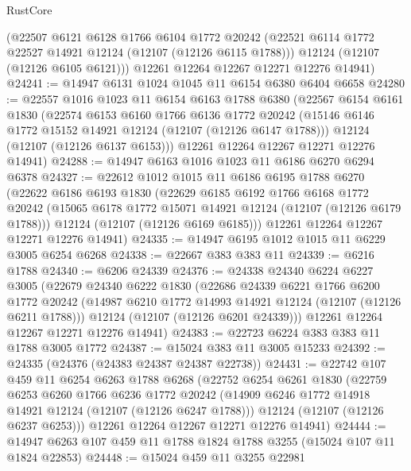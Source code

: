 \begin{lexlean}{RustCore}
\begin{coremodule}
      (@22507
        @6121
        @6128
        @1766
        @6104
        @1772
        @20242
        (@22521 @6114 @1772 @22527 @14921 @12124 (@12107 (@12126 @6115 @1788)))
        @12124
        (@12107 (@12126 @6105 @6121)))
      @12261
      @12264
      @12267
      @12271
      @12276
      @14941)
@24241 := @14947 @6131 @1024 @1045 @11 @6154 @6380 @6404 @6658
@24280 := @22557
    @1016
    @1023
    @11
    @6154
    @6163
    @1788
    @6380
    (@22567
      @6154
      @6161
      @1830
      (@22574
        @6153
        @6160
        @1766
        @6136
        @1772
        @20242
        (@15146 @6146 @1772 @15152 @14921 @12124 (@12107 (@12126 @6147 @1788)))
        @12124
        (@12107 (@12126 @6137 @6153)))
      @12261
      @12264
      @12267
      @12271
      @12276
      @14941)
@24288 := @14947 @6163 @1016 @1023 @11 @6186 @6270 @6294 @6378
@24327 := @22612
    @1012
    @1015
    @11
    @6186
    @6195
    @1788
    @6270
    (@22622
      @6186
      @6193
      @1830
      (@22629
        @6185
        @6192
        @1766
        @6168
        @1772
        @20242
        (@15065 @6178 @1772 @15071 @14921 @12124 (@12107 (@12126 @6179 @1788)))
        @12124
        (@12107 (@12126 @6169 @6185)))
      @12261
      @12264
      @12267
      @12271
      @12276
      @14941)
@24335 := @14947 @6195 @1012 @1015 @11 @6229 @3005 @6254 @6268
@24338 := @22667 @383 @383 @11
@24339 := @6216 @1788
@24340 := @6206 @24339
@24376 := @24338
    @24340
    @6224
    @6227
    @3005
    (@22679
      @24340
      @6222
      @1830
      (@22686
        @24339
        @6221
        @1766
        @6200
        @1772
        @20242
        (@14987 @6210 @1772 @14993 @14921 @12124 (@12107 (@12126 @6211 @1788)))
        @12124
        (@12107 (@12126 @6201 @24339)))
      @12261
      @12264
      @12267
      @12271
      @12276
      @14941)
@24383 := @22723 @6224 @383 @383 @11 @1788 @3005 @1772
@24387 := @15024 @383 @11 @3005 @15233
@24392 := @24335 (@24376 (@24383 @24387 @24387 @22738))
@24431 := @22742
    @107
    @459
    @11
    @6254
    @6263
    @1788
    @6268
    (@22752
      @6254
      @6261
      @1830
      (@22759
        @6253
        @6260
        @1766
        @6236
        @1772
        @20242
        (@14909 @6246 @1772 @14918 @14921 @12124 (@12107 (@12126 @6247 @1788)))
        @12124
        (@12107 (@12126 @6237 @6253)))
      @12261
      @12264
      @12267
      @12271
      @12276
      @14941)
@24444 := @14947 @6263 @107 @459 @11 @1788 @1824 @1788 @3255 (@15024 @107 @11 @1824 @22853)
@24448 := @15024 @459 @11 @3255 @22981

\end{coremodule}
\end{lexlean}
